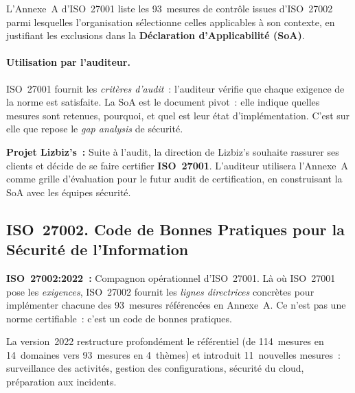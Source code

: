 L'Annexe~A d'ISO~27001 liste les 93~mesures de contrôle issues d'ISO~27002 parmi
lesquelles l'organisation sélectionne celles applicables à son contexte, en justifiant
les exclusions dans la \textbf{Déclaration d'Applicabilité (SoA)}.

\paragraph{Utilisation par l'auditeur.}
ISO~27001 fournit les \emph{critères d'audit}~: l'auditeur vérifie que chaque exigence
de la norme est satisfaite. La SoA est le document pivot~: elle indique quelles mesures
sont retenues, pourquoi, et quel est leur état d'implémentation. C'est sur elle que
repose le \emph{gap analysis} de sécurité.

\begin{boxlizbiz}
\textbf{Projet Lizbiz's~:}
Suite à l'audit, la direction de Lizbiz's souhaite rassurer ses clients et décide
de se faire certifier \textbf{ISO~27001}. L'auditeur utilisera l'Annexe~A comme
grille d'évaluation pour le futur audit de certification, en construisant la SoA
avec les équipes sécurité.
\end{boxlizbiz}

\subsection{ISO~27002. Code de Bonnes Pratiques pour la Sécurité de l'Information}
\label{subsec:iso27002}

\begin{boxdef}
\textbf{ISO~27002:2022~:} Compagnon opérationnel d'ISO~27001. Là où ISO~27001 pose
les \emph{exigences}, ISO~27002 fournit les \emph{lignes directrices} concrètes pour
implémenter chacune des 93~mesures référencées en Annexe~A. Ce n'est pas une norme
certifiable~: c'est un code de bonnes pratiques.
\end{boxdef}

La version~2022 restructure profondément le référentiel (de 114~mesures en 14~domaines
vers 93~mesures en 4~thèmes) et introduit 11~nouvelles mesures~: surveillance des
activités, gestion des configurations, sécurité du cloud, préparation aux incidents.


